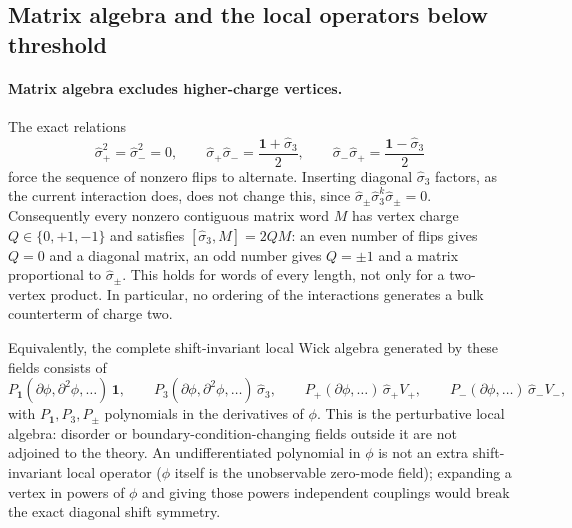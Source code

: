 \documentclass[11pt,a4paper]{article}
\numberwithin{equation}{section}
\begin{document}
\subsection{Matrix algebra and the local operators below threshold}\label{app:clos:classification}
\paragraph{Matrix algebra excludes higher-charge vertices.} The exact relations
\begin{equation}
 \hat\sigma_+^2=\hat\sigma_-^2=0,\qquad
 \hat\sigma_+\hat\sigma_-=\frac{\mathbf 1+\hat\sigma_3}{2},\qquad
 \hat\sigma_-\hat\sigma_+=\frac{\mathbf 1-\hat\sigma_3}{2}
\end{equation}
force the sequence of nonzero flips to alternate. Inserting diagonal $\hat\sigma_3$ factors, as the current
interaction does, does not change this, since $\hat\sigma_\pm\hat\sigma_3^k\hat\sigma_\pm=0$. Consequently every
nonzero contiguous matrix word $M$ has vertex charge $Q\in\{0,+1,-1\}$ and satisfies $[\hat\sigma_3,M]=2QM$: an even
number of flips gives $Q=0$ and a diagonal matrix, an odd number gives $Q=\pm1$ and a matrix proportional to
$\hat\sigma_\pm$. This holds for words of every length, not only for a two-vertex product. In particular, no ordering
of the interactions generates a bulk counterterm of charge two.

Equivalently, the complete shift-invariant local Wick algebra generated by these fields consists of
\begin{equation}
 P_{\mathbf 1}(\partial\phi,\partial^2\phi,\ldots)\,\mathbf 1,\qquad
 P_3(\partial\phi,\partial^2\phi,\ldots)\,\hat\sigma_3,\qquad
 P_+(\partial\phi,\ldots)\,\hat\sigma_+V_+,\qquad
 P_-(\partial\phi,\ldots)\,\hat\sigma_-V_-,
 \label{eq:clos:algebra}
\end{equation}
with $P_{\mathbf 1},P_3,P_\pm$ polynomials in the derivatives of $\phi$. This is the perturbative local algebra:
disorder or boundary-condition-changing fields outside it are not adjoined to the theory. An undifferentiated
polynomial in $\phi$ is not an extra shift-invariant local operator ($\phi$ itself is the unobservable zero-mode
field); expanding a vertex in powers of $\phi$ and giving those powers independent couplings would break the exact
diagonal shift symmetry.
\end{document}
